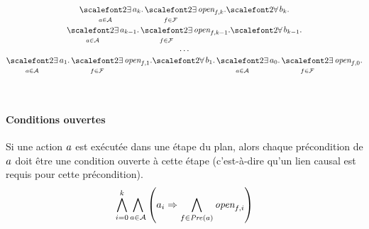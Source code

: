 \begin{small}
\[
\begin{matrix}
\displaystyle \bigexists_{\a \in \A} \a_{\depth}. \bigexists_{\f\in \F} \open{\f}{\depth}.%
\displaystyle {\bigforall b_{\depth}.}\\
\displaystyle \bigexists_{\a \in \A} \a_{\depth-1}. \bigexists_{\f\in \F} \open{\f}{\depth-1}.%
\displaystyle {\bigforall b_{\depth-1}.}\\
\displaystyle \dots\\ 
\displaystyle \bigexists_{\a \in \A} \a_{1}. \bigexists_{\f\in \F} \open{\f}{1}.%
\displaystyle {\bigforall b_{1}.}%
\displaystyle \bigexists_{\a \in \A} \a_{0}. \bigexists_{\f\in \F} \open{\f}{0}.
\end{matrix}
\]
\end{small}\\


\paragraph*{Conditions ouvertes}
Si une action $a$ est exécutée dans une étape du plan, alors chaque précondition de $a$ doit être une condition ouverte à cette étape (c'est-à-dire qu'un lien causal est requis pour cette précondition).
\[ \bigwedge\limits_{\substack{i=0}}^{k} \bigwedge\limits_{\substack{a \in \mathcal{A}}} \left(a_{i} \Rightarrow \bigwedge\limits_{\substack{f\in \mathit{Pre}(a)}} \textit{open}_{f,i}\right) \]

